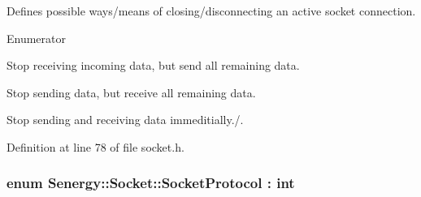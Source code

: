 Defines possible ways/means of closing/disconnecting an active socket connection. 

\begin{Desc}
\item[Enumerator]\par
\begin{description}
\item[{\em 
\hypertarget{class_senergy_1_1_socket_a88ed1eb1a5c47ea1b395715aabd37ab4a1851aea8452370ffbc6364027d018da9}{Stop\-Receiving}\label{class_senergy_1_1_socket_a88ed1eb1a5c47ea1b395715aabd37ab4a1851aea8452370ffbc6364027d018da9}
}]Stop receiving incoming data, but send all remaining data. \item[{\em 
\hypertarget{class_senergy_1_1_socket_a88ed1eb1a5c47ea1b395715aabd37ab4a948c383a847087d69042e091d164380b}{Stop\-Sending}\label{class_senergy_1_1_socket_a88ed1eb1a5c47ea1b395715aabd37ab4a948c383a847087d69042e091d164380b}
}]Stop sending data, but receive all remaining data. \item[{\em 
\hypertarget{class_senergy_1_1_socket_a88ed1eb1a5c47ea1b395715aabd37ab4a40b522922220c34afd8e1d4a3ba02208}{Stop\-All}\label{class_senergy_1_1_socket_a88ed1eb1a5c47ea1b395715aabd37ab4a40b522922220c34afd8e1d4a3ba02208}
}]Stop sending and receiving data immeditially./. \end{description}
\end{Desc}


Definition at line 78 of file socket.\-h.

\hypertarget{class_senergy_1_1_socket_ad400245278746ac26e261bdda171c178}{
\subsubsection[{Socket\-Protocol}]{\setlength{\rightskip}{0pt plus 5cm}enum {\bf Senergy\-::\-Socket\-::\-Socket\-Protocol} \-: int\hspace{0.3cm}{\ttfamily [strong]}}}\label{class_senergy_1_1_socket_ad400245278746ac26e261bdda171c178}


